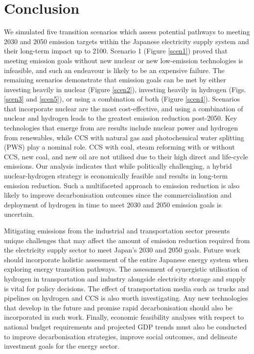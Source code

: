 \section{Conclusion} \label{Conclusion}

We simulated five transition scenarios which assess potential pathways to meeting 2030 and 2050 emission targets within the Japanese electricity supply system and their long-term impact up to 2100. Scenario 1 (Figure \ref{scen1}) proved that meeting emission goals without new nuclear or new low-emission technologies is infeasible, and such an endeavour is likely to be an expensive failure. The remaining scenarios demonstrate that emission goals can be met by either investing heavily in nuclear (Figure \ref{scen2}), investing heavily in hydrogen (Figs. \ref{scen3} and \ref{scen5}), or using a combination of both (Figure \ref{scen4}). Scenarios that incorporate nuclear are the most cost-effective, and using a combination of nuclear and hydrogen leads to the greatest emission reduction post-2050. Key technologies that emerge from are results include nuclear power and hydrogen from renewables, while \gls{CCS} with natural gas and photochemical water splitting (\gls{PWS}) play a nominal role. CCS with coal, steam reforming with or without CCS, new coal, and new oil are not utilised due to their high direct and life-cycle emissions. Our analysis indicates that while politically challenging, a hybrid nuclear-hydrogen strategy is economically feasible and results in long-term emission reduction. Such a multifaceted approach to emission reduction is also likely to improve decarbonisation outcomes since the commercialisation and deployment of hydrogen in time to meet 2030 and 2050 emission goals is uncertain.

Mitigating emissions from the industrial and transportation sector presents unique challenges that may affect the amount of emission reduction required from the electricity supply sector to meet Japan's 2030 and 2050 goals. Future work should incorporate holistic assessment of the entire Japanese energy system when exploring energy transition pathways. The assessment of synergistic utilisation of hydrogen in transportation and industry alongside electricity storage and supply is vital for policy decisions. The effect of transportation media such as trucks and pipelines on hydrogen and CCS is also worth investigating. Any new technologies that develop in the future and promise rapid decarbonisation should also be incorporated in such work. Finally, economic feasibility analyses with respect to national budget requirements and projected GDP trends must also be conducted to improve decarbonisation strategies, improve social outcomes, and delineate investment goals for the energy sector.

